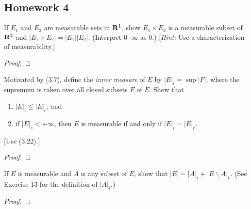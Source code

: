 \subsection{Homework 4}

\begin{problem}
If $E_1$ and $E_2$ are measurable sets in $\mathbf{R}^1$, show $E_1\times E_2$ is
a measurable subset of $\mathbf{R}^2$ and $|E_1\times E_2|=|E_1||E_2|$. (Interpret
$0\cdot\infty$ as $0$.) [\emph{Hint:} Use a characterization of
measurability.]
\end{problem}
\begin{proof}
\end{proof}

\begin{problem}
Motivated by (3.7), define the \emph{inner measure} of $E$ by
$|E|_i=\sup|F|$, where the supremum is taken over all closed subsets $F$ of
$E$. Show that
\begin{enumerate}[label=(\roman*)]
\item $|E|_i\leq|E|_e$, and
\item if $|E|_e<+\infty$, then $E$ is measurable if and only if
  $|E|_i=|E|_e$.
\end{enumerate}
[Use (3.22).]
\end{problem}
\begin{proof}
\end{proof}

\begin{problem}
If $E$ is measurable and $A$ is any subset of $E$, show that
$|E|=|A|_i+|E\smallsetminus A|_e$. (See Exercise 13 for
the definition of $|A|_i$.)
\end{problem}
\begin{proof}
\end{proof}


